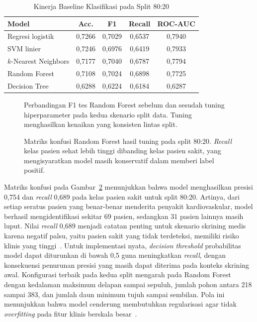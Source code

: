 \documentclass[conference]{IEEEtran}
\begin{document}
\begin{table}[t]
\caption{Kinerja Baseline Klasifikasi pada Split 80:20}
\label{tab:cardio_baseline}
\centering
\renewcommand{\arraystretch}{1.15}
\setlength{\tabcolsep}{3.5pt}
\begin{tabular}{lcccc}
\toprule
\textbf{Model} & \textbf{Acc.} & \textbf{F1} & \textbf{Recall} & \textbf{ROC-AUC} \\
\midrule
Regresi logistik       & 0{,}7266 & 0{,}7029 & 0{,}6537 & 0{,}7940 \\
SVM linier             & 0{,}7246 & 0{,}6976 & 0{,}6419 & 0{,}7933 \\
$k$-Nearest Neighbors  & 0{,}7177 & 0{,}7040 & 0{,}6787 & 0{,}7794 \\
Random Forest          & 0{,}7108 & 0{,}7024 & 0{,}6898 & 0{,}7725 \\
Decision Tree          & 0{,}6288 & 0{,}6224 & 0{,}6184 & 0{,}6287 \\
\bottomrule
\end{tabular}
\end{table}

\begin{figure}[t]
\centering

\caption{Perbandingan F1 tes Random Forest sebelum dan sesudah tuning hiperparameter pada kedua skenario split data. Tuning menghasilkan kenaikan yang konsisten lintas split.}
\label{fig:cardio_tuning}
\end{figure}

\begin{figure}[t]
\centering

\caption{Matriks konfusi Random Forest hasil tuning pada split 80:20. \textit{Recall} kelas pasien sehat lebih tinggi dibanding kelas pasien sakit, yang mengisyaratkan model masih konservatif dalam memberi label positif.}
\label{fig:cardio_cm}
\end{figure}

Matriks konfusi pada Gambar~\ref{fig:cardio_cm} menunjukkan bahwa model menghasilkan presisi 0{,}754 dan \textit{recall} 0{,}689 pada kelas pasien sakit untuk split 80:20. Artinya, dari setiap seratus pasien yang benar-benar menderita penyakit kardiovaskular, model berhasil mengidentifikasi sekitar 69 pasien, sedangkan 31 pasien lainnya masih luput. Nilai \textit{recall} 0{,}689 menjadi catatan penting untuk skenario skrining medis karena negatif palsu, yaitu pasien sakit yang tidak terdeteksi, memiliki risiko klinis yang tinggi~\cite{Ahmed2022,Yusuf2024Cardio,Pasha2024CVD}. Untuk implementasi nyata, \textit{decision threshold} probabilitas model dapat diturunkan di bawah 0{,}5 guna meningkatkan \textit{recall}, dengan konsekuensi penurunan presisi yang masih dapat diterima pada konteks skrining awal. Konfigurasi terbaik pada kedua split mengarah pada Random Forest dengan kedalaman maksimum delapan sampai sepuluh, jumlah pohon antara 218 sampai 383, dan jumlah daun minimum tujuh sampai sembilan. Pola ini menunjukkan bahwa model cenderung membutuhkan regularisasi agar tidak \textit{overfitting} pada fitur klinis berskala besar~\cite{KhanIcmla2020}.
\end{document}
